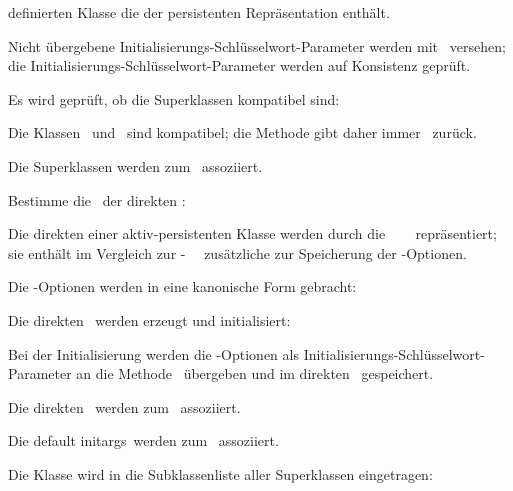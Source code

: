 \begin{infol}
\begin{block}
definierten Klasse die \sobjid\/ der persistenten Repr\"{a}sentation
enth\"{a}lt.
%
\begin{block}
%
\item Nicht \"{u}bergebene Initialisierungs-Schl\"{u}sselwort-Parameter
werden mit \ versehen; die
Initialisierungs-Schl\"{u}sselwort-Parameter werden auf Konsistenz
gepr\"{u}ft.
%
\item Es wird gepr\"{u}ft, ob die Superklassen kompatibel sind:\\
\item[\plobmtdchar] Die Klassen \ und
\ sind kompatibel; die Methode gibt daher immer
\lispt\ zur\"{u}ck.
%
\item Die Superklassen werden zum \clsmo\ assoziiert.
%
\item Bestimme die \sltmc\ der direkten \Slt[s]:\\
\item[\plobmtdchar] Die direkten \Slt[s]\/ einer aktiv-persistenten
Klasse werden durch die \spc\ \sltmc\ %
\ repr\"{a}sentiert; sie
enth\"{a}lt im Vergleich zur
\std-\sltmc\ \ %
zu\-s\"{a}tz\-li\-che \Slt[s]\/ zur Speicherung der \Slt\/-Optionen.
%
\item Die \Slt\/-Optionen werden in eine kanonische Form
gebracht:\lwclitem\\
%
\item Die direkten \sltmo[e]\ werden erzeugt und initialisiert:\\
\item[\plobmtdchar] Bei der Initialisierung werden die \Slt\/-Optionen
als Ini\-tia\-li\-sie\-rungs-Schl\"{u}s\-sel\-wort-Pa\-ra\-me\-ter an die
Methode \ \"{u}bergeben und im direkten
\sltmo\ gespeichert.
%
\item Die direkten \sltmo[e]\ werden zum \clsmo\ assoziiert.
%
\item Die
%
{default initargs}\ werden zum \clsmo\ assoziiert.
%
\item Die Klasse wird in die Subklassenliste aller Superklassen
eingetragen:\\

\end{block}
\end{block}
\end{infol}
